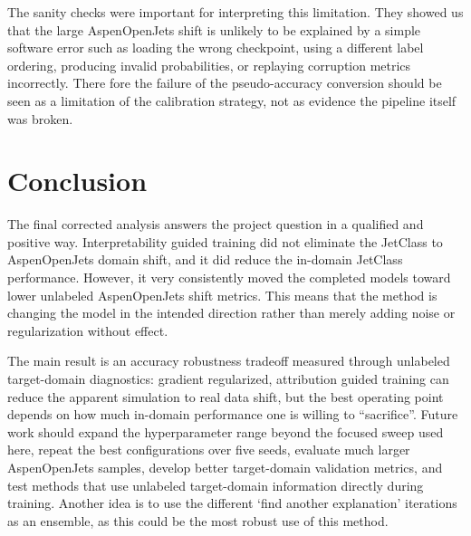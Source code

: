 \documentclass[11pt]{article}
\begin{document}
The sanity checks were important for interpreting this limitation. They showed us that the large AspenOpenJets shift is unlikely to be explained by a simple software error such as loading the wrong checkpoint, using a different label ordering, producing invalid probabilities, or replaying corruption metrics incorrectly. There fore the failure of the pseudo-accuracy conversion should be seen as a limitation of the calibration strategy, not as evidence the pipeline itself was broken.


\section{Conclusion}

The final corrected analysis answers the project question in a qualified and positive way. Interpretability guided training did not eliminate the JetClass to AspenOpenJets domain shift, and it did reduce the in-domain JetClass performance. However, it very consistently moved the completed models toward lower unlabeled AspenOpenJets shift metrics. This means that the method is changing the model in the intended direction rather than merely adding noise or regularization without effect.

The main result is an accuracy robustness tradeoff measured through unlabeled target-domain diagnostics: gradient regularized, attribution guided training can reduce the apparent simulation to real data shift, but the best operating point depends on how much in-domain performance one is willing to “sacrifice”.  Future work should expand the hyperparameter range beyond the focused sweep used here, repeat the best configurations over five seeds, evaluate much larger AspenOpenJets samples, develop better target-domain validation metrics, and test methods that use unlabeled target-domain information directly during training. Another idea is to use the different ‘find another explanation’ iterations as an ensemble, as this could be the most robust use of this method.



\end{document}
